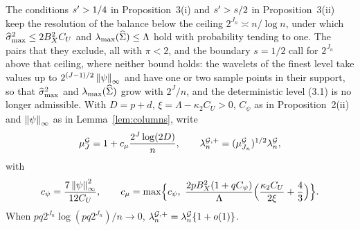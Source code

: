 The conditions $s' > 1/4$ in Proposition~3(i) and $s' > s/2$ in
Proposition~3(ii) keep the resolution of the balance below the ceiling
$2^{J_n} \asymp n/\log n$, under which $\widehat{\sigma}_{\max}^{2} \le 2B_X^{2}C_U$ and
$\lambda_{\max}(\widehat{\Sigma}) \le \Lambda$ hold with probability tending to one. The pairs
that they exclude, all with $\pi < 2$, and the boundary $s = 1/2$ call for
$2^{J_n}$ above that ceiling, where neither bound holds: the wavelets of the
finest level take values up to $2^{(J-1)/2}\left\lVert \psi \right\rVert_{\infty}$ and have one
or two sample points in their support, so that $\widehat{\sigma}_{\max}^{2}$ and
$\lambda_{\max}(\widehat{\Sigma})$ grow with $2^{J}/n$, and the deterministic level (3.1) is
no longer admissible. With $D = p + d$, $\xi = \Lambda - \kappa_2C_U > 0$,
$C_\psi$ as in Proposition~2(ii) and $\left\lVert \psi \right\rVert_{\infty}$ as in
Lemma~\ref{lem:columns}, write
\begin{equation}
  \label{eq:mu-blocks}
  \mu^{\mathcal{G}}_{J} = 1 + c_{\mu}\frac{2^{J}\log(2D)}{n},
  \qquad
  \lambda^{\mathcal{G},+}_{n} = (\mu^{\mathcal{G}}_{J_n})^{1/2}\lambda^{\mathcal{G}}_{n},
\end{equation}
with
\[
  c_{\psi} = \frac{7\left\lVert \psi \right\rVert_{\infty}^{2}}{12C_U},
  \qquad
  c_{\mu} = \max\Bigl\{c_{\psi},\
  \frac{2pB_X^{2}(1+qC_\psi)}{\Lambda}
  \Bigl(\frac{\kappa_2C_U}{2\xi} + \frac43\Bigr)\Bigr\}.
\]
When $pq2^{J_n}\log(pq2^{J_n})/n \to 0$, $\lambda^{\mathcal{G},+}_{n} = \lambda^{\mathcal{G}}_{n}\{1 + o(1)\}$.

